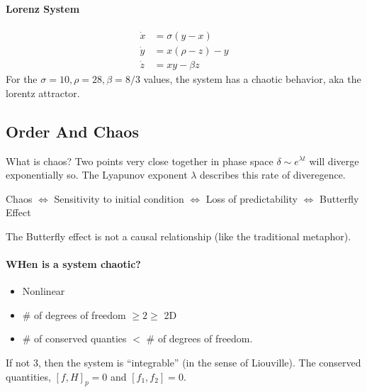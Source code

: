 \documentclass[../main.tex]{subfiles}
\begin{document}
\paragraph*{Lorenz System}
\begin{align*}
    \dot x &= \sigma(y - x) \\
    \dot y &= x(\rho - z) - y \\
    \dot z &= xy - \beta z
\end{align*}
For the $\sigma = 10, \rho = 28, \beta = 8/3$ values, the system has a chaotic behavior, aka the 
lorentz attractor.

\newpage
\subsection*{Order And Chaos}
What is chaos? Two points very close together in phase space $\delta \sim e^{\lambda t}$ will 
diverge exponentially so. The Lyapunov exponent $\lambda$ describes this rate of diveregence.
\begin{center}
    Chaos $\Leftrightarrow$ Sensitivity to initial condition 
    $\Leftrightarrow$ Loss of predictability 
    $\Leftrightarrow$ Butterfly Effect
\end{center}
The Butterfly effect is not a causal relationship (like the traditional metaphor).

\paragraph*{WHen is a system chaotic?}
\begin{itemize}
    \item Nonlinear
    \item \# of degrees of freedom $\geq 2 \geq$ 2D
    \item \# of conserved quanties $<$ \# of degrees of freedom. 
\end{itemize}
If not 3, then the system is ``integrable'' (in the sense of Liouville). The conserved quantities,
$[f, H]_p = 0$ and $[f_1, f_2] = 0$.
\end{document}
